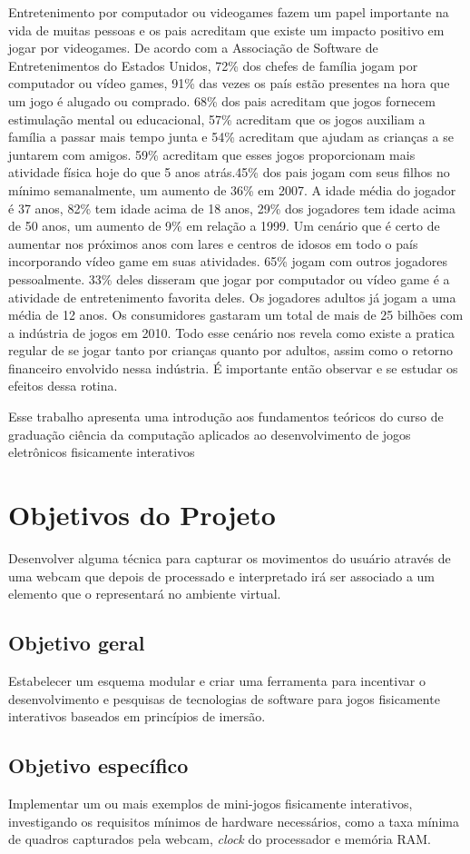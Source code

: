Entretenimento por computador ou videogames fazem um papel importante na vida de muitas pessoas e os pais acreditam que existe um impacto positivo em jogar por videogames.
De acordo com a Associação de Software de Entretenimentos do Estados Unidos\cite{ESA}, 72\% dos chefes de família jogam por computador ou vídeo games,
91\% das vezes os país estão presentes na hora que um jogo é alugado ou comprado. 68\% dos pais acreditam que jogos fornecem estimulação mental ou educacional,
57\% acreditam que os jogos auxiliam a família a passar mais tempo junta e 54\% acreditam que ajudam as crianças a se juntarem com amigos. 59\% acreditam que esses
jogos proporcionam mais atividade física hoje do que 5 anos atrás.45\% dos pais jogam com seus filhos no mínimo semanalmente, um aumento de 36\% em 2007.
A idade média do jogador é 37 anos, 82\% tem idade acima de 18 anos, 29\% dos jogadores tem idade acima de 50 anos, um aumento de 9\% em relação a 1999.
Um cenário que é certo de aumentar nos próximos anos com lares e centros de idosos em todo o país incorporando vídeo game em suas atividades.
65\% jogam com outros jogadores pessoalmente. 33\% deles disseram que jogar por computador ou vídeo game é a atividade de entretenimento favorita deles.
Os jogadores adultos já jogam a uma média de 12 anos. Os consumidores gastaram um total de mais de 25 bilhões com a indústria de jogos em 2010.
Todo esse cenário nos revela como existe a pratica regular de se jogar tanto por crianças quanto por adultos, assim como o retorno financeiro envolvido nessa
indústria. É importante então observar e se estudar os efeitos dessa rotina.



Esse trabalho apresenta uma introdução aos fundamentos teóricos do curso de graduação ciência da computação aplicados ao desenvolvimento de jogos eletrônicos
fisicamente interativos

\section{Objetivos do Projeto}

Desenvolver alguma técnica para capturar os movimentos do usuário através de uma webcam que depois de processado e interpretado irá ser associado a um elemento
que o representará no ambiente virtual.

\subsection{Objetivo geral}

Estabelecer um esquema modular e criar uma ferramenta para incentivar o desenvolvimento e pesquisas de tecnologias de software para jogos fisicamente interativos
baseados em princípios de imersão.

\subsection{Objetivo específico}

Implementar um ou mais exemplos de mini-jogos fisicamente interativos, investigando os requisitos mínimos de hardware necessários, como a taxa mínima de quadros
capturados pela webcam, \textit{clock} do processador e memória RAM.

